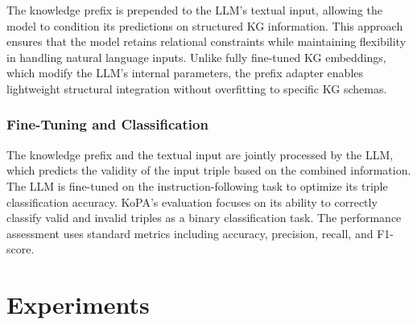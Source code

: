 \documentclass[12pt,a4paper]{article}
\begin{document}
The knowledge prefix is prepended to the LLM’s textual input, allowing the model to condition its predictions on structured KG information.
This approach ensures that the model retains relational constraints while maintaining flexibility in handling natural language inputs.
Unlike fully fine-tuned KG embeddings, which modify the LLM’s internal parameters, the prefix adapter enables lightweight structural integration without overfitting to specific KG schemas.

\subsubsection{Fine-Tuning and Classification}

The knowledge prefix and the textual input are jointly processed by the LLM,
which predicts the validity of the input triple based on the combined information.
The LLM is fine-tuned on the instruction-following task to optimize its triple classification accuracy.
KoPA's evaluation focuses on its ability to correctly classify valid and invalid triples as a binary classification task.
The performance assessment uses standard metrics including accuracy, precision, recall, and F1-score.
%
%


\section{Experiments}\label{sec:experiments}
\end{document}
